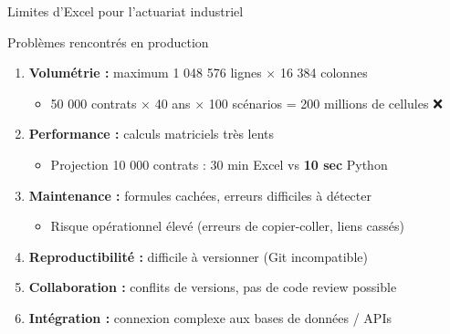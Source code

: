 \documentclass[10pt,aspectratio=169]{beamer}
\newcommand{\highlight}[1]{\textbf{\color{rougeactu}#1}}
\begin{document}
\begin{frame}{Limites d'Excel pour l'actuariat industriel}
\begin{alertblock}{Problèmes rencontrés en production}
\begin{enumerate}
    \item \textbf{Volumétrie :} maximum 1 048 576 lignes × 16 384 colonnes
    \begin{itemize}
        \item 50 000 contrats × 40 ans × 100 scénarios = 200 millions de cellules \textcolor{rougeactu}{❌}
    \end{itemize}
    
    \item \textbf{Performance :} calculs matriciels très lents
    \begin{itemize}
        \item Projection 10 000 contrats : 30 min Excel vs \highlight{10 sec} Python
    \end{itemize}
    
    \item \textbf{Maintenance :} formules cachées, erreurs difficiles à détecter
    \begin{itemize}
        \item Risque opérationnel élevé (erreurs de copier-coller, liens cassés)
    \end{itemize}
    
    \item \textbf{Reproductibilité :} difficile à versionner (Git incompatible)
    
    \item \textbf{Collaboration :} conflits de versions, pas de code review possible
    
    \item \textbf{Intégration :} connexion complexe aux bases de données / APIs
\end{enumerate}
\end{alertblock}
\end{frame}
\end{document}
